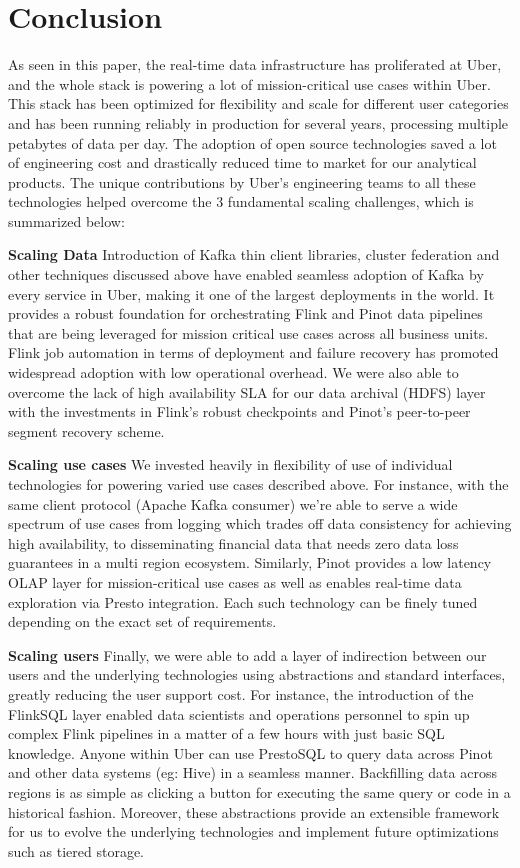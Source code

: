 \documentclass[sigconf]{acmart}
\begin{document}
\section{Conclusion} \label{sec:conclusion}

As seen in this paper, the real-time data infrastructure has proliferated at Uber, and the whole stack is powering a lot of mission-critical use cases within Uber. This stack has been optimized for flexibility and scale for different user categories and has been running reliably in production for several years, processing multiple petabytes of data per day. The adoption of open source technologies saved a lot of engineering cost and drastically reduced time to market for our analytical products. The unique contributions by Uber’s engineering teams to all these technologies helped overcome the 3 fundamental scaling challenges, which is summarized below:

{\bfseries Scaling Data} Introduction of Kafka thin client libraries, cluster federation and other techniques discussed above have enabled seamless adoption of Kafka by every service in Uber, making it one of the largest deployments in the world. It provides a robust foundation for orchestrating Flink and Pinot data pipelines that are being leveraged for mission critical use cases across all business units. Flink job automation in terms of deployment and failure recovery has promoted widespread adoption with low operational overhead. We were also able to overcome the lack of high availability SLA for our data archival (HDFS) layer with the investments in Flink’s robust checkpoints and Pinot’s peer-to-peer segment recovery scheme.

{\bfseries Scaling use cases} We invested heavily in flexibility of use of individual technologies for powering varied use cases described above. For instance, with the same client protocol (Apache Kafka consumer) we’re able to serve a wide spectrum of use cases from logging which trades off data consistency for achieving high availability, to disseminating financial data that needs zero data loss guarantees in a multi region ecosystem. Similarly, Pinot provides a low latency OLAP layer for mission-critical use cases as well as enables real-time data exploration via Presto integration. Each such technology can be finely tuned depending on the exact set of requirements. 

{\bfseries Scaling users} Finally, we were able to add a layer of indirection between our users and the underlying technologies using abstractions and standard interfaces, greatly reducing the user support cost. For instance, the introduction of the FlinkSQL layer enabled data scientists and operations personnel to spin up complex Flink pipelines in a matter of a few hours with just basic SQL knowledge. Anyone within Uber can use PrestoSQL to query data across Pinot and other data systems (eg: Hive) in a seamless manner. Backfilling data across regions is as simple as clicking a button for executing the same query or code in a historical fashion. Moreover, these abstractions provide an extensible framework for us to evolve the underlying technologies and implement future optimizations such as tiered storage. 
\end{document}

